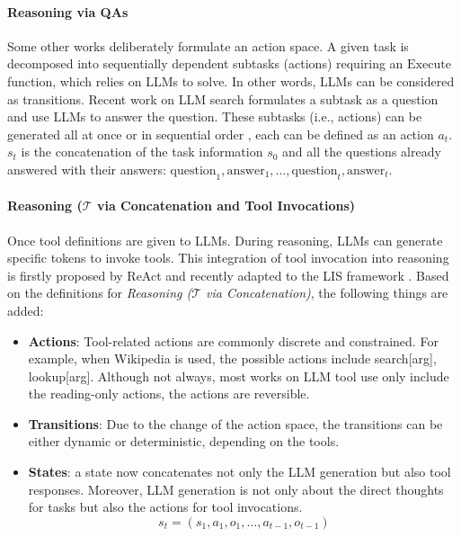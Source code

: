 \paragraph{Reasoning via QAs} 
Some other works deliberately formulate an action space.
A given task is decomposed into sequentially dependent subtasks (actions) requiring an $\text{Execute}$ function, which relies on LLMs to solve. In other words, LLMs can be considered as transitions.
Recent work on LLM search formulates a subtask as a question and use LLMs to answer the question. These subtasks (i.e., actions) can be generated all at once \citep{zhou2023leasttomost} or in sequential order \citep{hao-etal-2023-reasoning}, each can be defined as an action $a_t$.  
$s_t$ is the concatenation of the task information $s_0$ and all the questions already answered with their answers: $\text{question}_1, \text{answer}_1, \ldots, \text{question}_{t}, \text{answer}_{t}$.

\paragraph{Reasoning ($\mathcal{T}$ via Concatenation and Tool Invocations)}
Once tool definitions are given to LLMs. During reasoning, LLMs can generate specific tokens to invoke tools. This integration of tool invocation into reasoning is firstly proposed by ReAct \citet{yao2023react} and recently adapted to the LIS framework \citep{zhou2024language}.
Based on the definitions for \emph{Reasoning ($\mathcal{T}$ via Concatenation)}, the following things are added:
\begin{itemize}
    \item \textbf{Actions}: Tool-related actions are commonly discrete and constrained. For example, when Wikipedia is used, the possible actions include search[arg], lookup[arg]. Although not always, most works on LLM tool use only include the reading-only actions, the actions are reversible.
    
    \item \textbf{Transitions}: Due to the change of the action space, the transitions can be either dynamic or deterministic, depending on the tools.
    
    \item \textbf{States}: a state now concatenates not only the LLM generation but also tool responses. Moreover, LLM generation is not only about the direct thoughts for tasks but also the actions for tool invocations.
        \begin{equation}
        s_t=\left(s_1, a_1, o_1, \ldots, a_{t-1}, o_{t-1}\right) %
        \label{eq:state_by_action_concat2}
    \end{equation}
\end{itemize}

